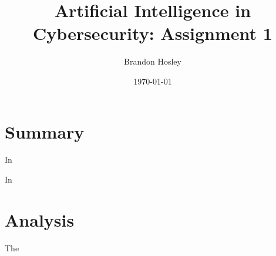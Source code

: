 \documentclass[]{article}
\title{Artificial Intelligence in Cybersecurity: Assignment 1}
\author{Brandon Hosley}
\date{\today}
\begin{document}
	\maketitle
	
\section{Summary} 

In 

In 

\section{Analysis}

The 

\clearpage


\end{document}
